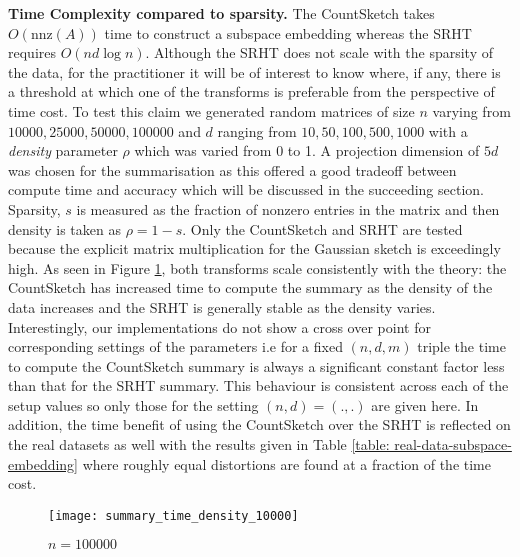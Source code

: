 \documentclass[twoside]{article}
\newcommand{\nnz}[1]{\text{nnz}(#1)}
\theoremstyle{definition}\newtheorem{thm}{Theorem}[section]
\theoremstyle{definition}\newtheorem{mydef}[thm]{Definition}
\theoremstyle{definition}\newtheorem{rem}[thm]{Remark}
\theoremstyle{definition}\newtheorem{prop}[thm]{Proposition}
\theoremstyle{definition}\newtheorem{example}[thm]{Example}
\theoremstyle{definition}\newtheorem{claim}[thm]{Claim}
\theoremstyle{definition}\newtheorem{Qu}[thm]{Question}
\theoremstyle{definition}\newtheorem{Lemma}[thm]{Lemma}
\theoremstyle{definition}\newtheorem{Cor}[thm]{Corollary}
\theoremstyle{definition}\newtheorem{Fact}[]{Fact}
\begin{document}
\noindent\textbf{Time Complexity compared to sparsity.} The CountSketch takes
$O(\nnz{A})$ time to construct a subspace embedding
whereas the SRHT requires $O(nd \log n)$.
Although the SRHT does not scale with the sparsity of the data, for the
practitioner it
will be of interest to know where, if any, there is a threshold at which one of
the transforms is preferable from the perspective of time cost.
To test this claim we generated random matrices of size $n$ varying from
$10000, 25000, 50000, 100000$ and $d$ ranging from $10,50,100,500,1000$
with a \textit{density} parameter $\rho$ which was varied from 0 to 1.
A projection dimension of $5d$ was chosen for the summarisation as this offered
a good tradeoff between compute time and accuracy which will be discussed in the
succeeding section.
Sparsity, $s$ is measured as the fraction of nonzero entries in the matrix and
then density is taken as $\rho = 1 - s$.
Only the CountSketch and SRHT are tested because the explicit matrix
multiplication for the Gaussian sketch is exceedingly high.
As seen in Figure \ref{fig: summary-time-100000}, both transforms scale
consistently with the theory: the CountSketch has increased time to compute the
summary as the density of the data increases and the SRHT is generally stable as
the density varies.
Interestingly, our implementations do not show a cross over point for corresponding
settings of the parameters i.e for a fixed $(n,d,m)$ triple the time to compute the
CountSketch summary is always a significant constant factor less than that for
the SRHT summary.
This behaviour is consistent across each of the setup values so only those for
the setting $(n,d) = (.,.)$ are given here.
In addition, the time benefit of using the CountSketch over the SRHT is reflected
on the real datasets as well with the results given in Table
\ref{table: real-data-subspace-embedding}
where roughly equal distortions are found at a fraction of the time cost.

\begin{figure}
  \centering
\texttt{[image: summary\_time\_density\_10000]}
        \caption{$n=100000$}
        \label{fig: summary-time-100000}
\end{figure}


\end{document}
